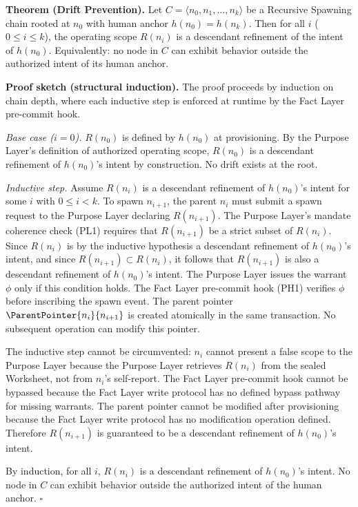 \medskip
\noindent\textbf{Theorem (Drift Prevention).} Let $C = \langle n_0, n_1, \ldots, n_k \rangle$ be a Recursive Spawning chain rooted at $n_0$ with human anchor $h(n_0) = h(n_k)$. Then for all $i$ ($0 \leq i \leq k$), the operating scope $R(n_i)$ is a descendant refinement of the intent of $h(n_0)$. Equivalently: no node in $C$ can exhibit behavior outside the authorized intent of its human anchor.

\medskip
\noindent\textbf{Proof sketch (structural induction).} The proof proceeds by induction on chain depth, where each inductive step is enforced at runtime by the Fact Layer pre-commit hook.

\medskip
\textit{Base case ($i=0$).} $R(n_0)$ is defined by $h(n_0)$ at provisioning. By the Purpose Layer's definition of authorized operating scope, $R(n_0)$ is a descendant refinement of $h(n_0)$'s intent by construction. No drift exists at the root.

\medskip
\textit{Inductive step.} Assume $R(n_i)$ is a descendant refinement of $h(n_0)$'s intent for some $i$ with $0 \leq i < k$. To spawn $n_{i+1}$, the parent $n_i$ must submit a spawn request to the Purpose Layer declaring $R(n_{i+1})$. The Purpose Layer's mandate coherence check (PL1) requires that $R(n_{i+1})$ be a strict subset of $R(n_i)$. Since $R(n_i)$ is by the inductive hypothesis a descendant refinement of $h(n_0)$'s intent, and since $R(n_{i+1}) \subset R(n_i)$, it follows that $R(n_{i+1})$ is also a descendant refinement of $h(n_0)$'s intent. The Purpose Layer issues the warrant $\phi$ only if this condition holds. The Fact Layer pre-commit hook (PH1) verifies $\phi$ before inscribing the spawn event. The parent pointer $\ParentPointer{n_i}{n_{i+1}}$ is created atomically in the same transaction. No subsequent operation can modify this pointer.

The inductive step cannot be circumvented: $n_i$ cannot present a false scope to the Purpose Layer because the Purpose Layer retrieves $R(n_i)$ from the sealed Worksheet, not from $n_i$'s self-report. The Fact Layer pre-commit hook cannot be bypassed because the Fact Layer write protocol has no defined bypass pathway for missing warrants. The parent pointer cannot be modified after provisioning because the Fact Layer write protocol has no modification operation defined. Therefore $R(n_{i+1})$ is guaranteed to be a descendant refinement of $h(n_0)$'s intent.

By induction, for all $i$, $R(n_i)$ is a descendant refinement of $h(n_0)$'s intent. No node in $C$ can exhibit behavior outside the authorized intent of the human anchor. $\square$

